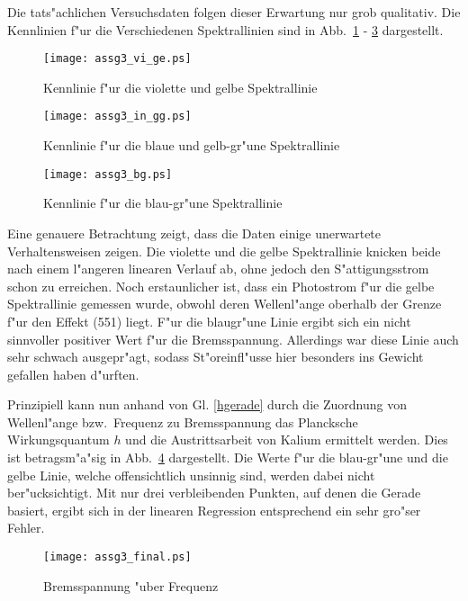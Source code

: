 \documentclass[a4paper,10pt]{article}
\begin{document}
    Die tats"achlichen Versuchsdaten folgen dieser Erwartung nur grob qualitativ. Die Kennlinien f"ur die Verschiedenen Spektrallinien sind in Abb.~\ref{assg3_vi_ge} - \ref{assg3_bg} dargestellt.
    \begin{figure}[p]
      \centering
      \texttt{[image: assg3\_vi\_ge.ps]}
    \caption{Kennlinie f"ur die violette und gelbe Spektrallinie}
    \label{assg3_vi_ge}
    \end{figure}
    \begin{figure}[p]
      \centering
      \texttt{[image: assg3\_in\_gg.ps]}
    \caption{Kennlinie f"ur die blaue und gelb-gr"une Spektrallinie}
    \label{assg3_in_gg}
    \end{figure}
    \begin{figure}[p]
      \centering
      \texttt{[image: assg3\_bg.ps]}
    \caption{Kennlinie f"ur die blau-gr"une Spektrallinie}
    \label{assg3_bg}
    \end{figure}
    Eine genauere Betrachtung zeigt, dass die Daten einige unerwartete Verhaltensweisen zeigen. Die violette und die gelbe Spektrallinie knicken beide nach einem l"angeren linearen Verlauf ab, ohne jedoch den S"attigungsstrom schon zu erreichen. Noch erstaunlicher ist, dass ein Photostrom f"ur die gelbe Spektrallinie gemessen wurde, obwohl deren Wellenl"ange oberhalb der Grenze f"ur den Effekt (\unit{551}{\nano\meter}) liegt. F"ur die blaugr"une Linie ergibt sich ein nicht sinnvoller positiver Wert f"ur die Bremsspannung. Allerdings war diese Linie auch sehr schwach ausgepr"agt, sodass St"oreinfl"usse hier besonders ins Gewicht gefallen haben d"urften.

    Prinzipiell kann nun anhand von Gl. \ref{hgerade} durch die Zuordnung von Wellenl"ange bzw.\ Frequenz zu Bremsspannung das Plancksche Wirkungsquantum $h$ und die Austrittsarbeit von Kalium ermittelt werden. Dies ist betragsm"a"sig in Abb.~\ref{assg3_final} dargestellt. Die Werte f"ur die blau-gr"une und die gelbe Linie, welche offensichtlich unsinnig sind, werden dabei nicht ber"ucksichtigt. Mit nur drei verbleibenden Punkten, auf denen die Gerade basiert, ergibt sich in der linearen Regression entsprechend ein sehr gro"ser Fehler.

    \begin{figure}[p]
      \centering
      \texttt{[image: assg3\_final.ps]}
    \caption{Bremsspannung "uber Frequenz}
    \label{assg3_final}
    \end{figure}
\end{document}
